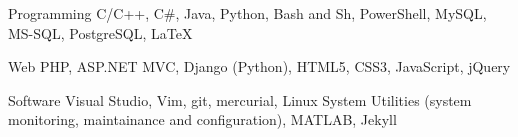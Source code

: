 
\begin{cvskills}

\cvskill
  {Programming} %
  {C/C++, C\#, Java, Python, Bash and Sh, PowerShell, MySQL, MS-SQL, PostgreSQL,
   LaTeX} %

\cvskill
  {Web} %
  {PHP, ASP.NET MVC, Django (Python), HTML5, CSS3, JavaScript, jQuery} %

\cvskill
  {Software} %
  {Visual Studio, Vim, git, mercurial, Linux System Utilities (system
   monitoring, maintainance and configuration), MATLAB, Jekyll} %

\end{cvskills}
